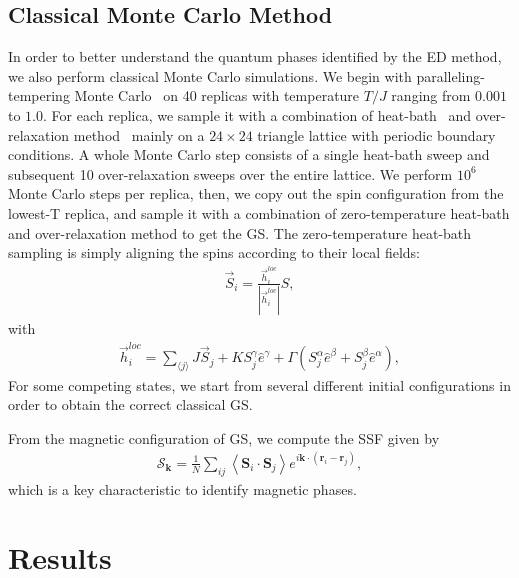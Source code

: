 \documentclass[aps,prb,reprint,amsfonts,amsmath,amssymb,showpacs,groupedaddress,superscriptaddress]{revtex4-1}
\begin{document}
\subsection{\label{subsec:MethodMC}Classical Monte Carlo Method}

In order to better understand the quantum phases identified by the ED method, we also perform classical Monte Carlo simulations. We begin with paralleling-tempering Monte Carlo~\cite{Hukushima96} on 40 replicas with temperature $T/J$ ranging from $0.001$ to $1.0$. For each replica, we sample it with a combination of heat-bath~\cite{Miyatake84} and over-relaxation method~\cite{Berg} mainly on a $24 \times 24$ triangle lattice with periodic boundary conditions. A whole Monte Carlo step consists of a single heat-bath sweep and subsequent 10 over-relaxation sweeps over the entire lattice. We perform $10^6$ Monte Carlo steps per replica, then, we copy out the spin configuration from the lowest-T replica, and sample it with a combination of zero-temperature heat-bath and over-relaxation method to get the GS. The zero-temperature heat-bath sampling is simply aligning the spins according to their local fields:
\begin{align}
    \vec{S}_{i} = \frac{\vec{h}_{i}^{loc}}{|\vec{h}_{i}^{loc}|} S,
\end{align}
with
\begin{align}
    \vec{h}_{i}^{loc} = \sum_{\langle j \rangle} J \vec{S}_{j} + K {S}^{\gamma}_{j} \hat{e}^{\gamma} + \Gamma (S^{\alpha}_{j} \hat{e}^{\beta} + S^{\beta}_{j} \hat{e}^{\alpha}),
\end{align}
For some competing states, we start from several different initial configurations in order to obtain the correct classical GS.

From the magnetic configuration of GS, we compute the SSF given by
\begin{align}
    \mathcal{S}_{\bm{k}} = \frac{1}{N} \sum_{ij} \left \langle \bm{S}_i \cdot \bm{S}_j \right \rangle e^{i \bm{k} \cdot (\bm{r}_i-\bm{r}_j)},
\end{align}
which is a key characteristic to identify magnetic phases.

\section{\label{sec:Results}Results}
\end{document}
